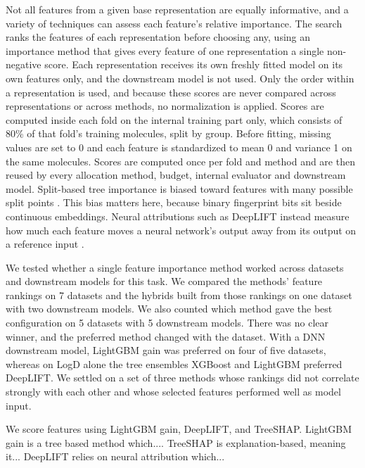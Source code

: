 Not all features from a given base representation are equally informative, and a variety of techniques can assess each feature's relative importance. The search ranks the features of each representation before choosing any, using an importance method that gives every feature of one representation a single non-negative score. Each representation receives its own freshly fitted model on its own features only, and the downstream model is not used. Only the order within a representation is used, and because these scores are never compared across representations or across methods, no normalization is applied. Scores are computed inside each fold on the internal training part only, which consists of 80\% of that fold's training molecules, split by group. Before fitting, missing values are set to 0 and each feature is standardized to mean 0 and variance 1 on the same molecules. Scores are computed once per fold and method and are then reused by every allocation method, budget, internal evaluator and downstream model. Split-based tree importance is biased toward features with many possible split points \citep{Strobl2007}. This bias matters here, because binary fingerprint bits sit beside continuous embeddings. Neural attributions such as DeepLIFT instead measure how much each feature moves a neural network's output away from its output on a reference input \citep{Ancona2018}.

We tested whether a single feature importance method worked across datasets and downstream models for this task. We compared the methods' feature rankings on 7 datasets and the hybrids built from those rankings on one dataset with two downstream models. We also counted which method gave the best configuration on 5 datasets with 5 downstream models. There was no clear winner, and the preferred method changed with the dataset. With a DNN downstream model, LightGBM gain was preferred on four of five datasets, whereas on LogD alone the tree ensembles XGBoost and LightGBM preferred DeepLIFT. We settled on a set of three methods whose rankings did not correlate strongly with each other and whose selected features performed well as model input.

We score features using LightGBM gain, DeepLIFT, and TreeSHAP. LightGBM gain is a tree based method which.... TreeSHAP is explanation-based, meaning it... DeepLIFT relies on neural attribution which...


